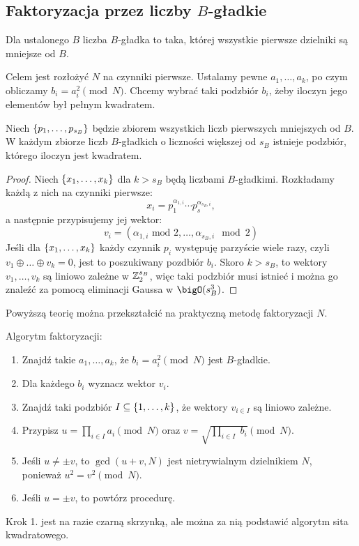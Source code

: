 \subsection{Faktoryzacja przez liczby \( B \)-gładkie}
\begin{definition}
    Dla ustalonego \( B \) liczba \( B \)-gładka to taka, której wszystkie pierwsze dzielniki są mniejsze od \( B \).
\end{definition}
    
Celem jest rozłożyć \( N \) na czynniki pierwsze. Ustalamy pewne \( a_1, \dots, a_k \), po czym obliczamy \( b_i = a_i^2 \pmod{N} \). Chcemy wybrać taki podzbiór \(b_i \), żeby iloczyn jego elementów był pełnym kwadratem.

\begin{lemma}
    Niech \( \set{p_1, \dots, p_{s_B}} \) będzie zbiorem wszystkich liczb pierwszych mniejszych od \( B \). W każdym zbiorze liczb \( B \)-gładkich o liczności większej od \( s_B \) istnieje podzbiór, którego iloczyn jest kwadratem.
\end{lemma}
\begin{proof}
    Niech \( \set{x_1, \dots, x_k} \) dla \( k > s_B \) będą liczbami \( B \)-gładkimi. Rozkładamy każdą z nich na czynniki pierwsze:
    \[
        x_i = p_1^{\alpha_{1, i}} \cdots p_s^{\alpha_{s_B, i}},
    \]
    a następnie przypisujemy jej wektor:
    \[
        v_i = (\alpha_{1, i} \text{ mod } 2, \dots, \alpha_{s_B, i} \mod 2)
    \]
    Jeśli dla \( \set{x_1, \dots, x_k} \) każdy czynnik \( p_i \) występuję parzyście wiele razy, czyli \( v_1 \oplus \ldots \oplus v_k = 0 \), jest to poszukiwany pozdbiór \( b_i \).
    Skoro \( k > s_B \), to wektory \( v_1, \dots, v_k \) są liniowo zależne w \( \mathbb{Z}_2^{s_B} \), więc taki podzbiór musi istnieć i można go znaleźć za pomocą eliminacji Gaussa w \( \bigO(s_B^3) \).
\end{proof}
Powyższą teorię można przekształcić na praktyczną metodę faktoryzacji \( N \).
\begin{greyframe}
    Algorytm faktoryzacji:
    \begin{enumerate}
        \item Znajdź takie \( a_1, \dots, a_k \), że \( b_i = a_i^2 \pmod{N} \) jest \( B \)-gładkie.
        \item Dla każdego \( b_i \) wyznacz wektor \( v_i \).
        \item Znajdź taki podzbiór \( I \subseteq \set{1, \dots, k} \), że wektory \( v_{i \in I} \) są liniowo zależne.
        \item Przypisz \( u = \prod_{i \in I} a_i \pmod{N} \) oraz \( v = \sqrt{\prod_{i \in I}\; b_i} \pmod{N} \).
        \item Jeśli \( u \neq \pm v \), to \( \gcd(u + v, N) \) jest nietrywialnym dzielnikiem \( N \), \\ ponieważ \( u^2 = v^2 \pmod{N} \).
        \item Jeśli \( u = \pm v \), to powtórz procedurę.
    \end{enumerate}
\end{greyframe}
Krok 1. jest na razie czarną skrzynką, ale można za nią podstawić algorytm sita kwadratowego.

